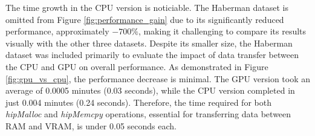 The time growth in the CPU version is noticiable.
The Haberman dataset is omitted from Figure \ref{fig:performance_gain} due to its significantly reduced performance, approximately $-700\%$, making it challenging to compare its results visually with the other three datasets. Despite its smaller size, the Haberman dataset was included primarily to evaluate the impact of data transfer between the CPU and GPU on overall performance. As demonstrated in Figure \ref{fig:gpu_vs_cpu}, the performance decrease is minimal. The GPU version took an average of 0.0005 minutes (0.03 seconds), while the CPU version completed in just 0.004 minutes (0.24 seconds). Therefore, the time required for both \emph{hipMalloc} and \emph{hipMemcpy} operations, essential for transferring data between RAM and VRAM, is under 0.05 seconds each.

